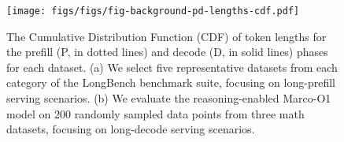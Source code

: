 \begin{figure}[ht]
\begin{center}
\centerline{\texttt{[image: figs/figs/fig-background-pd-lengths-cdf.pdf]}}
\caption{The Cumulative Distribution Function (CDF) of token lengths for the prefill (P, in dotted lines) and decode (D, in solid lines) phases for each dataset. (a) We select five representative datasets from each category of the LongBench benchmark suite, focusing on long-prefill serving scenarios. (b) We evaluate the reasoning-enabled Marco-O1 model on 200 randomly sampled data points from three math datasets, focusing on long-decode serving scenarios.}
\label{fig-background-pd-lengths-cdf}
\end{center}
\end{figure}